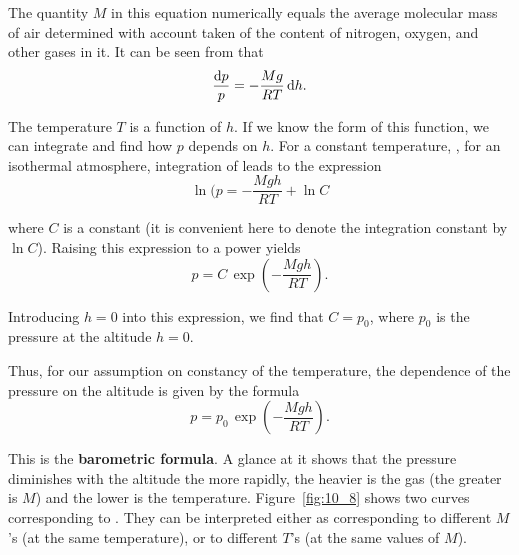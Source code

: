 \noindent
The quantity $M$ in this equation numerically equals the average molecular mass of air determined with account taken of the content of nitrogen, oxygen, and other gases in it. It can be seen from  that
\begin{equation}\label{eq:10_70}
	\frac{\mathrm{d} p}{p} = -\frac{Mg}{RT}\,\mathrm{d} h.
\end{equation}

\noindent
The temperature $T$ is a function of $h$. If we know the form of this function, we can integrate  and find how $p$ depends on $h$. For a constant temperature, \ie, for an isothermal atmosphere, integration of  leads to the expression
\begin{equation*}
	\ln({p} = -\frac{Mgh}{RT} + \ln{C}
\end{equation*}

\noindent
where $C$ is a constant (it is convenient here to denote the integration constant by $\ln{C}$). Raising this expression to a power yields
\begin{equation*}
	p = C\,\exp\left(- \frac{Mgh}{RT} \right).
\end{equation*}

\noindent
Introducing $h=0$ into this expression, we find that $C=p_0$, where $p_0$ is the pressure at the altitude $h=0$.

Thus, for our assumption on constancy of the temperature, the dependence of the pressure on the altitude is given by the formula
\begin{equation}\label{eq:10_71}
	p = p_0\,\exp\left(- \frac{Mgh}{RT} \right).
\end{equation}

\noindent
This is the \textbf{barometric formula}. A glance at it shows that the pressure diminishes with the altitude the more rapidly, the heavier is the gas (the greater is $M$) and the lower is the temperature. Figure~\ref{fig:10_8} shows two curves corresponding to . They can be interpreted either as corresponding to different $M$'s (at the same temperature), or to different $T$'s (at the same values of $M$).
